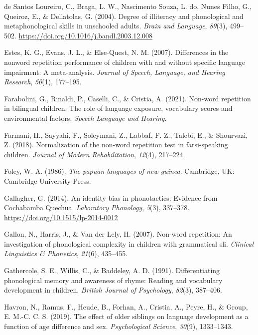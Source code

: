 \documentclass[english,,man,floatsintext]{apa6}
\begin{document}
\leavevmode\hypertarget{ref-de2004degree}{}%
de Santos Loureiro, C., Braga, L. W., Nascimento Souza, L. do, Nunes Filho, G., Queiroz, E., \& Dellatolas, G. (2004). Degree of illiteracy and phonological and metaphonological skills in unschooled adults. \emph{Brain and Language}, \emph{89}(3), 499--502. \url{https://doi.org/10.1016/j.bandl.2003.12.008}

\leavevmode\hypertarget{ref-estes2007differences}{}%
Estes, K. G., Evans, J. L., \& Else-Quest, N. M. (2007). Differences in the nonword repetition performance of children with and without specific language impairment: A meta-analysis. \emph{Journal of Speech, Language, and Hearing Research}, \emph{50}(1), 177--195.

\leavevmode\hypertarget{ref-farabolini2021nonword}{}%
Farabolini, G., Rinaldi, P., Caselli, C., \& Cristia, A. (2021). Non-word repetition in bilingual children: The role of language exposure, vocabulary scores and environmental factors. \emph{Speech Language and Hearing}.

\leavevmode\hypertarget{ref-farmani2018normalization}{}%
Farmani, H., Sayyahi, F., Soleymani, Z., Labbaf, F. Z., Talebi, E., \& Shourvazi, Z. (2018). Normalization of the non-word repetition test in farsi-speaking children. \emph{Journal of Modern Rehabilitation}, \emph{12}(4), 217--224.

\leavevmode\hypertarget{ref-foley1986papuan}{}%
Foley, W. A. (1986). \emph{The papuan languages of new guinea}. Cambridge, UK: Cambridge University Press.

\leavevmode\hypertarget{ref-gallagher2014identity}{}%
Gallagher, G. (2014). An identity bias in phonotactics: Evidence from Cochabamba Quechua. \emph{Laboratory Phonology}, \emph{5}(3), 337--378. \url{https://doi.org/10.1515/lp-2014-0012}

\leavevmode\hypertarget{ref-gallon2007non}{}%
Gallon, N., Harris, J., \& Van der Lely, H. (2007). Non-word repetition: An investigation of phonological complexity in children with grammatical sli. \emph{Clinical Linguistics \& Phonetics}, \emph{21}(6), 435--455.

\leavevmode\hypertarget{ref-gathercole1991differentiating}{}%
Gathercole, S. E., Willis, C., \& Baddeley, A. D. (1991). Differentiating phonological memory and awareness of rhyme: Reading and vocabulary development in children. \emph{British Journal of Psychology}, \emph{82}(3), 387--406.

\leavevmode\hypertarget{ref-havron2019effect}{}%
Havron, N., Ramus, F., Heude, B., Forhan, A., Cristia, A., Peyre, H., \& Group, E. M.-C. C. S. (2019). The effect of older siblings on language development as a function of age difference and sex. \emph{Psychological Science}, \emph{30}(9), 1333--1343.
\end{document}
